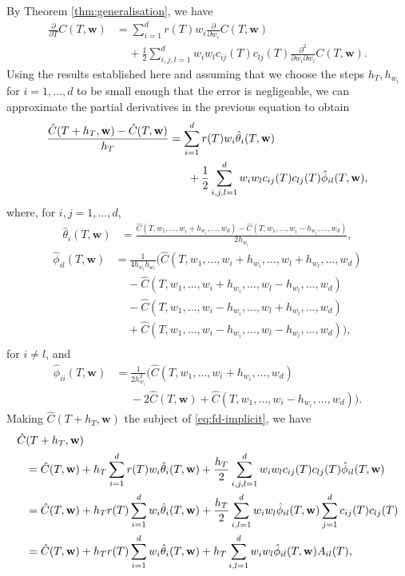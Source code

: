 \documentclass[english]{article}
\numberwithin{equation}{section}
\numberwithin{figure}{section}
\theoremstyle{bolddescit}
\theoremstyle{definition}
\theoremstyle{definition}
\theoremstyle{plain}
\theoremstyle{plain}
\theoremstyle{bolddesc}
\theoremstyle{plain}
\theoremstyle{remark}
\begin{document}
By Theorem \ref{thm:generalisation}, we have
\begin{align*}
  \frac{\partial}{\partial T} C(T,\mathbf{w})
  &= \sum_{i=1}^{d} r(T) w_i \frac{\partial}{\partial w_i} C(T,\mathbf{w})\\
  &\ \ \ \ \ + \frac{1}{2} \sum_{i,j,l=1}^{d} w_i w_l c_{ij}(T) c_{lj}(T) \frac{\partial^2}{\partial w_i \partial w_l} C(T,\mathbf{w}).
\end{align*}
Using the results established here and assuming that we choose the steps $h_T, h_{w_i}$ for $i=1,\ldots,d$ to be small enough that the error is negligeable, we can approximate the partial derivatives in the previous equation to obtain
\begin{align}\label{eq:fd-implicit}
  \frac{\hat{C}(T+h_T,\mathbf{w}) - \hat{C}(T,\mathbf{w})}{h_T}
  &= \sum_{i=1}^{d} r(T) w_i \hat{\theta}_i(T,\mathbf{w})\notag\\
    &\ \ \ \ \ + \frac{1}{2} \sum_{i,j,l=1}^{d} w_i w_l c_{ij}(T) c_{lj}(T) \hat{\phi}_{il}(T,\mathbf{w}),
\end{align}
where, for $i,j=1,\ldots,d$,
\begin{align*}
  \hat{\theta}_i(T,\mathbf{w})
  &= \frac{\hat{C}(T,w_1,\ldots,w_i+h_{w_i},\ldots,w_d) - \hat{C}(T,w_1,\ldots,w_i-h_{w_i},\ldots,w_d)}{2h_{w_i}},
\end{align*}
\begin{align*}
  \hat{\phi}_{il}(T,\mathbf{w})
  &= \frac{1}{4 h_{w_i} h_{w_l}} \Bigg( \hat{C}(T,w_1,\ldots,w_i+h_{w_i},\ldots,w_l+h_{w_l},\ldots,w_d)\\
  &\ \ \ \ \ - \hat{C}(T,w_1,\ldots,w_i+h_{w_i},\ldots,w_l-h_{w_l},\ldots,w_d)\\
  &\ \ \ \ \ - \hat{C}(T,w_1,\ldots,w_i-h_{w_i},\ldots,w_l+h_{w_l},\ldots,w_d)\\
  &\ \ \ \ \ + \hat{C}(T,w_1,\ldots,w_i-h_{w_i},\ldots,w_l-h_{w_l},\ldots,w_d) \Bigg),\\
\end{align*}
for $i \neq l$, and
\begin{align*}
  \hat{\phi}_{ii}(T,\mathbf{w})
  &= \frac{1}{2 h_{w_i}^2} \Bigg( \hat{C}(T,w_1,\ldots,w_i+h_{w_i},\ldots,w_d)\\
  & \ \ \ \ \ \ - 2\hat{C}(T,\mathbf{w}) + \hat{C}(T,w_1,\ldots,w_i-h_{w_i},\ldots,w_d) \Bigg).
\end{align*}
Making $\hat{C}(T+h_T, \mathbf{w})$ the subject of \eqref{eq:fd-implicit}, we have
\begin{align}
  \hat{C}&(T+h_T,\mathbf{w})\notag\\
  &= \hat{C}(T,\mathbf{w}) + h_T \sum_{i=1}^{d} r(T) w_i \hat{\theta}_i(T,\mathbf{w})
     + \frac{h_T}{2} \sum_{i,j,l=1}^{d} w_i w_l c_{ij}(T) c_{lj}(T) \hat{\phi}_{il}(T,\mathbf{w})\notag\\
  &= \hat{C}(T,\mathbf{w}) + h_T r(T) \sum_{i=1}^{d} w_i \hat{\theta}_i(T,\mathbf{w}) + \frac{h_T}{2} \sum_{i,l=1}^{d} w_i w_l \hat{\phi}_{il}(T,\mathbf{w}) \sum_{j=1}^d c_{ij}(T) c_{lj}(T)\notag\\
  &= \hat{C}(T,\mathbf{w}) + h_T r(T) \sum_{i=1}^{d} w_i \hat{\theta}_i(T,\mathbf{w}) + h_T \sum_{i,l=1}^{d} w_i w_l \hat{\phi}_{il}(T,\mathbf{w}) A_{il}(T),\label{eq:fd-chat-recur}
\end{align}
\end{document}
